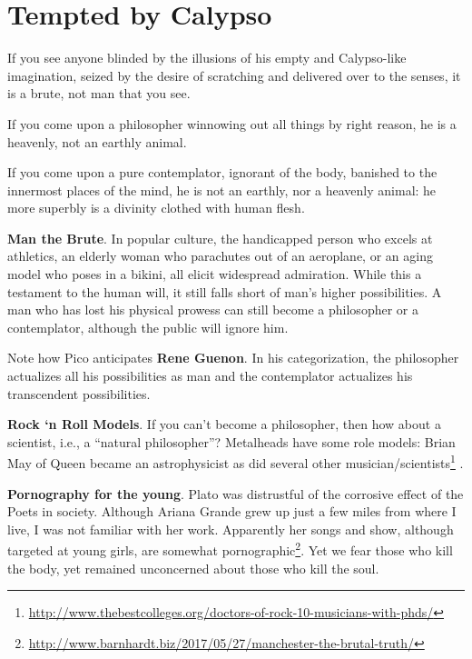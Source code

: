 \section{Tempted by Calypso}

\begin{quotationx}
If you see anyone blinded by the illusions of his empty and Calypso-like imagination, seized by the desire of scratching and delivered over to the senses, it is a brute, not man that you see.

If you come upon a philosopher winnowing out all things by right reason, he is a heavenly, not an earthly animal.

If you come upon a pure contemplator, ignorant of the body, banished to the innermost places of the mind, he is not an earthly, nor a heavenly animal: he more superbly is a divinity clothed with human flesh.

\end{quotationx}


\textbf{Man the Brute}. In popular culture, the handicapped person who excels at athletics, an elderly woman who parachutes out of an aeroplane, or an aging model who poses in a bikini, all elicit widespread admiration. While this a testament to the human will, it still falls short of man's higher possibilities. A man who has lost his physical prowess can still become a philosopher or a contemplator, although the public will ignore him.

Note how Pico anticipates \textbf{Rene Guenon}. In his categorization, the philosopher actualizes all his possibilities as man and the contemplator actualizes his transcendent possibilities.

\textbf{Rock `n Roll Models}. If you can't become a philosopher, then how about a scientist, i.e., a ``natural philosopher''? Metalheads have some role models: Brian May of Queen became an astrophysicist as did several other musician/scientists\footnote{\url{http://www.thebestcolleges.org/doctors-of-rock-10-musicians-with-phds/}} .

\textbf{Pornography for the young}. Plato was distrustful of the corrosive effect of the Poets in society. Although Ariana Grande grew up just a few miles from where I live, I was not familiar with her work. Apparently her songs and show, although targeted at young girls, are somewhat pornographic\footnote{\url{http://www.barnhardt.biz/2017/05/27/manchester-the-brutal-truth/}}. Yet we fear those who kill the body, yet remained unconcerned about those who kill the soul.

